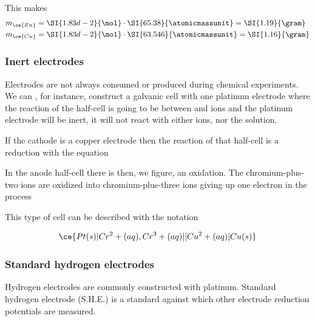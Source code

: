 \documentclass[../mit-general-chemistry.tex]{subfiles}
\begin{document}
\begin{example}
\begin{enumerate}[label=\arabic*)]
      This makes
      \begin{align*}
        &m_{\ce{Zn}}
        = \SI{1.83d-2}{\mol} \cdot \SI{65.38}{\atomicmassunit}
        = \SI{1.19}{\gram} \\
        &m_{\ce{Cu}}
        = \SI{1.83d-2}{\mol} \cdot \SI{63.546}{\atomicmassunit}
        = \SI{1.16}{\gram} \\
      \end{align*}
  \end{enumerate}
\end{example}







\subsubsection{Inert electrodes}



Electrodes are not always consumed or produced during chemical
experiments. We can , for instance, construct a galvanic cell with one
platinum electrode where the reaction of the half-cell is going to be
between  and  ions and the platinum electrode will
be inert, it will not react with either ions, nor the solution.

If the cathode is a copper electrode then the reaction of that
half-cell is a reduction with the equation


In the anode half-cell there is then, we figure, an oxidation. The
chromium-plus-two ions are oxidized into chromium-plus-three ions
giving up one electron in the process


This type of cell can be described with the notation

\begin{equation}
  \ce{Pt(s) | Cr^2+(aq), Cr^3+(aq) || Cu^2+(aq) | Cu(s)}
\end{equation}




\subsubsection{Standard hydrogen electrodes}


Hydrogen electrodes are commonly constructed with platinum. Standard
hydrogen electrode (S.H.E.) is a standard against which other
electrode reduction potentials are measured.
\end{document}
